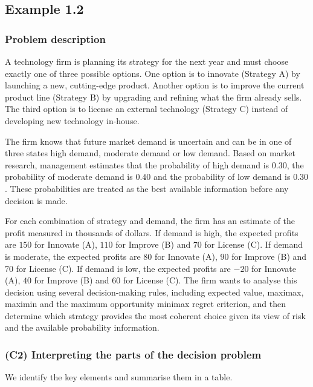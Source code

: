 \subsection{Example 1.2}\label{example-1-2}
	
	\subsubsection{Problem description}\label{example-1-problem}
	
	A technology firm is planning its strategy for the next year and must choose exactly one of three possible options.
	One option is to innovate (Strategy A) by launching a new, cutting-edge product. Another option is to improve the current product line
	(Strategy B) by upgrading and refining what the firm already sells. The third option is to license an external technology (Strategy C)
	instead of developing new technology in-house.
	
	The firm knows that future market demand is uncertain and can be in one of three states high demand, moderate demand or low demand.
	Based on market research, management estimates that the probability of high demand is \(0.30\), the probability of moderate demand is \(0.40\)
	and the probability of low demand is \(0.30\). These probabilities are treated as the best available information before any decision is made.
	
	For each combination of strategy and demand, the firm has an estimate of the profit measured in thousands of dollars.
	If demand is high, the expected profits are \(150\) for Innovate (A), \(110\) for Improve (B) and \(70\) for License (C).
	If demand is moderate, the expected profits are \(80\) for Innovate (A), \(90\) for Improve (B) and \(70\) for License (C).
	If demand is low, the expected profits are \(-20\) for Innovate (A), \(40\) for Improve (B) and \(60\) for License (C).
	The firm wants to analyse this decision using several decision-making rules, including expected value, maximax, maximin
	and the maximum opportunity minimax regret criterion, and then determine which strategy provides the most coherent choice
	given its view of risk and the available probability information.
	
	
	\subsubsection{(C2) Interpreting the parts of the decision problem}\label{example-1-c2}
	
	We identify the key elements and summarise them in a table.
	
